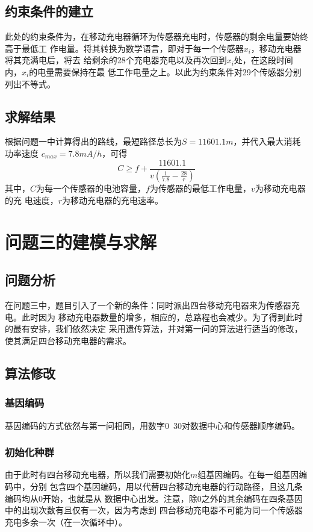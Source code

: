 \documentclass{ctexart}
\begin{document}
    \subsection{约束条件的建立}
    此处的约束条件为，在移动充电器循环为传感器充电时，传感器的剩余电量要始终高于最低工
    作电量。将其转换为数学语言，即对于每一个传感器$x_i$，移动充电器将其充满电后，将去
    给剩余的28个充电器充电以及再次回到$x_i$处，在这段时间内，$x_i$的电量需要保持在最
    低工作电量之上。以此为约束条件对29个传感器分别列出不等式。
    \subsection{求解结果}
    根据问题一中计算得出的路线，最短路径总长为$S=11601.1m$，并代入最大消耗功率速度
    $c_{max}=7.8mA/h$，可得
    \begin{equation}
        C\geq f+\frac{11601.1}{v(\frac{1}{7.8}-\frac{28}{r})}
    \end{equation}
    其中，$C$为每一个传感器的电池容量，$f$为传感器的最低工作电量，$v$为移动充电器的充
    电速度，$r$为移动充电器的充电速率。

    \section{问题三的建模与求解}
    \subsection{问题分析}
    在问题三中，题目引入了一个新的条件：同时派出四台移动充电器来为传感器充电。此时因为
    移动充电器数量的增多，相应的，总路程也会减少。为了得到此时的最有安排，我们依然决定
    采用遗传算法，并对第一问的算法进行适当的修改，使其满足四台移动充电器的需求。
    \subsection{算法修改}
    \subsubsection{基因编码}
    基因编码的方式依然与第一问相同，用数字0~30对数据中心和传感器顺序编码。
    \subsubsection{初始化种群}
    由于此时有四台移动充电器，所以我们需要初始化$m$组基因编码。在每一组基因编码中，分别
    包含四个基因编码，用以代替四台移动充电器的行动路径，且这几条编码均从0开始，也就是从
    数据中心出发。注意，除0之外的其余编码在四条基因中的出现次数有且仅有一次，因为考虑到
    四台移动充电器不可能为同一个传感器充电多余一次（在一次循环中）。
\end{document}
